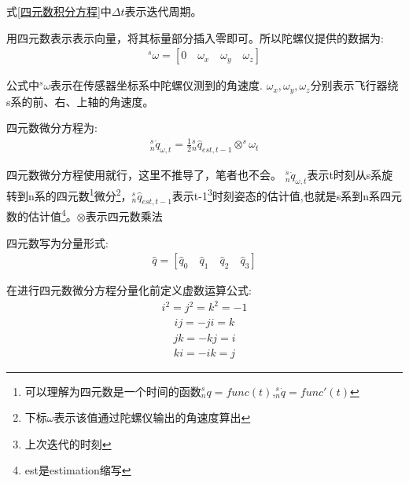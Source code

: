 \documentclass[12pt,a4paper]{article}
\begin{document}
式\ref{四元数积分方程}中$\Delta t$表示迭代周期。

用四元数表示表示向量，将其标量部分插入零即可。所以陀螺仪提供的数据为:
\begin{eqnarray}
    ^s\omega=[0\quad\omega_{x}\quad\omega_{y}\quad\omega_{z}] \label{陀螺仪数据}
\end{eqnarray}

公式中$^s\omega$表示在传感器坐标系中陀螺仪测到的角速度.
$\omega_{x},\omega_{y},\omega_{z}$分别表示飞行器绕s系的前、右、上轴的角速度。

四元数微分方程为:
\begin{eqnarray}
    ^s_n\dot{q}_{\omega,t}=\frac{1}{2}{^s_n\hat{q}_{est,t-1}}\otimes^s\omega_t \label{四元数微分方程}
\end{eqnarray}

四元数微分方程使用就行，这里不推导了，笔者也不会。
$^s_n\dot{q}_{\omega,t}$表示t时刻从s系旋转到n系的四元数\footnote{可以理解为四元数是一个时间的函数$^s_n{q}=func(t)$,$^s_n\dot{q}=func'(t)$}微分\footnote{下标$\omega$表示该值通过陀螺仪输出的角速度算出}，${^s_n\hat{q}_{est,t-1}}$表示t-1\footnote{上次迭代的时刻}时刻姿态的估计值,也就是s系到n系四元数的估计值\footnote{est是estimation缩写}。$\otimes$表示四元数乘法

四元数写为分量形式:
\begin{eqnarray}
    \hat{q}=[\hat{q}_0\quad \hat{q}_1\quad \hat{q}_2\quad \hat{q}_3] \label{分量四元数}
\end{eqnarray}

在进行四元数微分方程分量化前定义虚数运算公式:
\begin{eqnarray}
    i^2 = j^2 = k^2 = -1
\end{eqnarray}
\begin{eqnarray}
    ij = -ji = k
\end{eqnarray}
\begin{eqnarray}
    jk = -kj = i
\end{eqnarray}
\begin{eqnarray}
    ki = -ik = j
\end{eqnarray}
\end{document}
